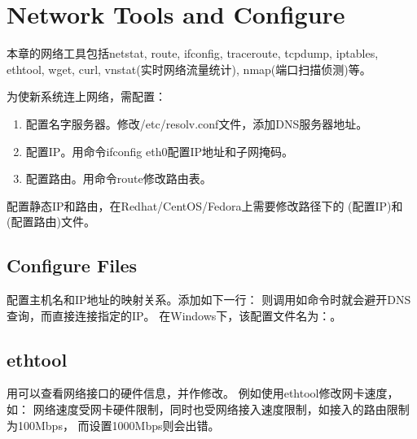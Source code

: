 \chapter{Network Tools and Configure}
本章的网络工具包括netstat, route, ifconfig, traceroute, tcpdump,
iptables, ethtool, wget, curl, 
vnstat(实时网络流量统计), nmap(端口扫描侦测)等。

为使新系统连上网络，需配置：
\begin{enumerate}
\item 配置名字服务器。修改/etc/resolv.conf文件，添加DNS服务器地址。
\item 配置IP。用命令ifconfig eth0配置IP地址和子网掩码。
\item 配置路由。用命令route修改路由表。
\end{enumerate}

配置静态IP和路由，在Redhat/CentOS/Fedora上需要修改路径下的
(配置IP)和(配置路由)文件。

\section{Configure Files}

配置主机名和IP地址的映射关系。添加如下一行：
则调用如命令时就会避开DNS查询，而直接连接指定的IP。
在Windows下，该配置文件名为：。

\section{ethtool}
用可以查看网络接口的硬件信息，并作修改。
例如使用ethtool修改网卡速度，如：
网络速度受网卡硬件限制，同时也受网络接入速度限制，如接入的路由限制为100Mbps，
而设置1000Mbps则会出错。

